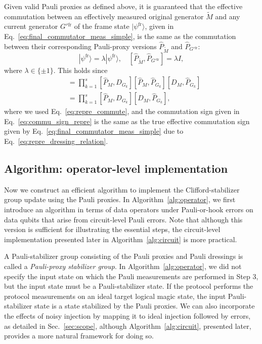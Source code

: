\documentclass[
 reprint,
 amsmath,amssymb,
 pra,superscriptaddress, nofootinbib
]{revtex4-2}
\theoremstyle{definition}
\theoremstyle{plain}
\begin{document}
Given valid Pauli proxies as defined above, it is guaranteed that the effective commutation between an effectively measured original generator $\tilde{M}$ and any current generator $G'{^\mathrm{fr}}$ of the frame state $|\psi^\mathrm{fr} \rangle$, given in Eq.~\eqref{eq:final_commutator_meas_simple}, is the same as the commutation between their corresponding Pauli-proxy versions $\hat{P}_{\tilde{M}}$ and $\hat{P}_{G'{^\mathrm{fr}}}$:
\begin{equation}
  [\tilde{M} ,G'{^\mathrm{fr}}]|\psi^\mathrm{fr} \rangle = \lambda |\psi^\mathrm{fr} \rangle, \quad [\hat{P}_{\tilde{M}} ,\hat{P}_{G'{^\mathrm{fr}}}] = \lambda I,
  \label{eq:compatible}
\end{equation}
where $\lambda \in \{\pm 1 \}$.
This holds since 
\begin{align}
  [\hat{P}_{\tilde{M}},
    \hat{P}_{G'{^\mathrm{fr}}}]
&=
  \prod_{k=1}^{s}
  [\hat{P}_{M},D_{G_k}][\hat{P}_{M},\hat{P}_{G_k}][D_M,\hat{P}_{G_k}]\\
&=
  \prod_{k=1}^{s}
  [\hat{P}_{M},D_{G_k}][D_M,\hat{P}_{G_k}],
  \label{eq:commu_sign_repre}
\end{align}
where we used Eq.~\eqref{eq:repre_commute}, and the commutation sign given in Eq.~\eqref{eq:commu_sign_repre} is the same as the true effective commutation sign given by Eq.~\eqref{eq:final_commutator_meas_simple} due to Eq.~\eqref{eq:repre_dressing_relation}.

\subsection{Algorithm: operator-level implementation}

Now we construct an efficient algorithm to implement the Clifford-stabilizer group update using the Pauli proxies.
In Algorithm~\ref{alg:operator}, we first introduce an algorithm in terms of data operators under Pauli-or-hook errors on data qubits that arise from circuit-level Pauli errors.
Note that although this version is sufficient for illustrating the essential steps, the circuit-level implementation presented later in Algorithm~\ref{alg:circuit} is more practical.

A Pauli-stabilizer group consisting of the Pauli proxies and Pauli dressings is called a \emph{Pauli-proxy stabilizer group}. 
In Algorithm~\ref{alg:operator}, we did not specify the input state on which the Pauli measurements are performed in Step $3$, but the input state must be a Pauli-stabilizer state. If the protocol performs the protocol measurements on an ideal target logical magic state, the input Pauli-stabilizer state is a state stabilized by the Pauli proxies.
We can also incorporate the effects of noisy injection by mapping it to ideal injection followed by errors, as detailed in Sec.~\ref{sec:scope}, although Algorithm~\ref{alg:circuit}, presented later, provides a more natural framework for doing so.
\end{document}

